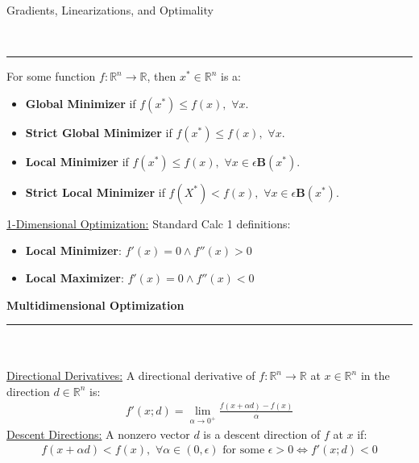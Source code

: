 \documentclass{article}
\newcommand{\header}[1]{\begin{large}\noindent #1\end{large}\\\rule{\textwidth}{0.5pt}}
\newcommand{\mheader}[1]{\textbf{#1}\\\rule{0.33\textwidth}{0.5pt}\\}
\newcommand{\sheader}[1]{\underline{#1:}}
\begin{document}
\header{Gradients, Linearizations, and Optimality}
For some function $f: \mathbb{R}^n \to \mathbb{R}$, then $x^* \in \mathbb{R}^n$ is a:
\begin{itemize}
    \item \textbf{Global Minimizer} if $f(x^*) \leq f(x), \,\, \forall x$.
    \item \textbf{Strict Global Minimizer} if $f(x^*) \leq f(x), \,\, \forall x$.
    \item \textbf{Local Minimizer} if $f(x^*) \leq f(x), \,\, \forall x \in \epsilon \mathbf{B}(x^*)$.
    \item \textbf{Strict Local Minimizer} if $f(X^*) < f(x), \,\, \forall x \in \epsilon \mathbf{B}(x^*)$.
\end{itemize}

\sheader{1-Dimensional Optimization} Standard Calc 1 definitions:
\begin{itemize}
    \item \textbf{Local Minimizer}: $f'(x) = 0 \wedge f''(x) > 0$
    \item \textbf{Local Maximizer}: $f'(x) = 0 \wedge f''(x) < 0$
\end{itemize}

\mheader{Multidimensional Optimization}\\
\sheader{Directional Derivatives} A directional derivative of $f: \mathbb{R}^n \to \mathbb{R}$ 
at $x \in \mathbb{R}^n$ in the direction $d \in \mathbb{R}^n$ is:
\begin{align*}
    f'(x;d) = \lim_{\alpha \to 0^+} \frac{f(x + \alpha d) - f(x)}{\alpha}
\end{align*}
\sheader{Descent Directions} A nonzero vector $d$ is a descent direction of $f$ at $x$ if:
\begin{align*}
    f(x + \alpha d) < f(x), \,\, \forall \alpha \in (0, \epsilon) \textrm{  for some  } \epsilon > 0 \iff f'(x;d) < 0
\end{align*}
\pagebreak
\end{document}
